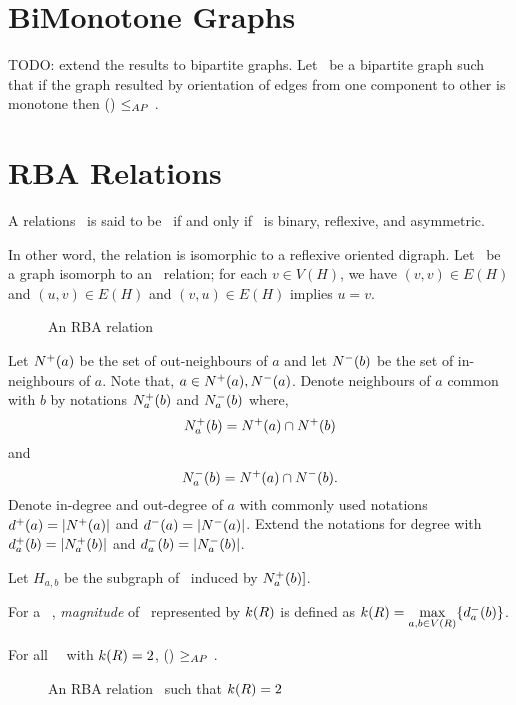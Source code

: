\section{BiMonotone Graphs}
TODO: extend the results to bipartite graphs.
Let \mG\ be a bipartite graph such that if the graph resulted by orientation of edges
from one component to other is monotone then \ccsp(\mG) \(\aple\) \cbis\@. 


\section{RBA Relations}
\begin{defi} [\RBA]
A relations \mR\ is said to be \RBA\ if and only if \mR\ is binary, reflexive, and asymmetric.
\end{defi} 

In other word, the relation is isomorphic to a reflexive oriented digraph. Let \mH\ be a 
graph isomorph to an \RBA\ relation; for each \(v \in V(H)\), we have \((v,v) \in E(H)\)
and \((u,v)\in E(H)\) and \((v,u) \in E(H)\) implies \(u=v\)\@.
\begin{figure}[h]
\center{}
\caption{An RBA relation}
\end{figure}
Let \(\nplus a\) be the set of out-neighbours of \(a\) and let \(\nminus b\) be
the set of in-neighbours of \(a\). Note that, \(a\in \nplus a,\nminus a\). 
Denote neighbours of \(a\) common with \(b\) by notations \(\naplus a b\) and \(\naminus a b\)
where,
\[\naplus a b = \nplus a \cap \nplus b\]
and 
\[\naminus a b = \nplus a \cap \nminus b.\]
Denote in-degree and out-degree of \(a\) with commonly used notations \(d^+(a)=|\nplus a|\)
and \(d^-(a)=|\nminus a|\)\@. Extend the notations for degree with 
\(d^+_a(b)=|\naplus a b|\) and \(\dmab=|\naminus a b|\)\@.

Let \(H_{a,b}\) be the subgraph of \mH\ induced by \(\naplus a b]\)\@.

\begin{defi}[Magnitude]
For a \RBA\ \mR, \emph{magnitude} of \mR\ represented by 
\(\magf(R)\) is defined as 
\(\magf(R) = \max \limits_{a,b \in V(R)} \setof{\dmab}\)\@.
\end{defi}

\begin{lemma} \label{lem:triangle-free}
For all \RBA\ \mR\ with \(\magf(R)=2\), \ccsp(\mR) \(\apge\) \cbis\@.
\end{lemma}
\begin{figure}[h]
\center{}
\caption{An RBA relation \mR\ such that \(\magf(R)=2\)}
\end{figure}

